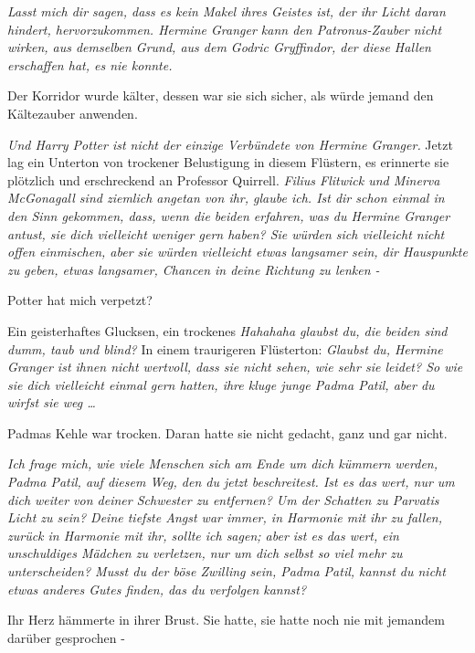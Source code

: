\glqq{}\emph{Lasst mich dir sagen, dass es kein Makel ihres Geistes ist, der ihr
Licht daran hindert, hervorzukommen. Hermine Granger kann den Patronus-Zauber
nicht wirken, aus demselben Grund, aus dem Godric Gryffindor, der diese Hallen
erschaffen hat, es nie konnte.}\grqq{}

Der Korridor wurde kälter, dessen war sie sich sicher, als würde jemand den
Kältezauber anwenden.

\glqq{}\emph{Und Harry Potter ist nicht der einzige Verbündete von Hermine
Granger.}\grqq{} Jetzt lag ein Unterton von trockener Belustigung in diesem Flüstern,
es erinnerte sie plötzlich und erschreckend an Professor Quirrell. \glqq{}
\emph{Filius Flitwick und Minerva McGonagall sind ziemlich angetan von ihr,
glaube ich. Ist dir schon einmal in den Sinn gekommen, dass, wenn die beiden
erfahren, was du Hermine Granger antust, sie dich vielleicht weniger gern haben?
Sie würden sich vielleicht nicht offen einmischen, aber sie würden vielleicht
etwas langsamer sein, dir Hauspunkte zu geben, etwas langsamer, Chancen in deine
Richtung zu lenken -}\grqq{}

\glqq{}Potter hat mich verpetzt?\grqq{}

Ein geisterhaftes Glucksen, ein trockenes \glqq{}\emph{Hahahaha glaubst du, die
beiden sind dumm, taub und blind?\grqq{}} In einem traurigeren Flüsterton:
\glqq{}\emph{Glaubst du, Hermine Granger ist ihnen nicht wertvoll, dass sie nicht
sehen, wie sehr sie leidet? So wie sie dich vielleicht einmal gern hatten, ihre
kluge junge Padma Patil, aber du wirfst sie weg …}\grqq{}

Padmas Kehle war trocken. Daran hatte sie nicht gedacht, ganz und gar nicht.

\glqq{}\emph{Ich frage mich, wie viele Menschen sich am Ende um dich kümmern
werden, Padma Patil, auf diesem Weg, den du jetzt beschreitest. Ist es das wert,
nur um dich weiter von deiner Schwester zu entfernen? Um der Schatten zu
Parvatis Licht zu sein? Deine tiefste Angst war immer, in Harmonie mit ihr zu
fallen, zurück in Harmonie mit ihr, sollte ich sagen; aber ist es das wert, ein
unschuldiges Mädchen zu verletzen, nur um dich selbst so viel mehr zu
unterscheiden? Musst du der böse Zwilling sein, Padma Patil, kannst du nicht
etwas anderes Gutes finden, das du verfolgen kannst?}\grqq{}

Ihr Herz hämmerte in ihrer Brust. Sie hatte, sie hatte noch nie mit jemandem
darüber gesprochen -

